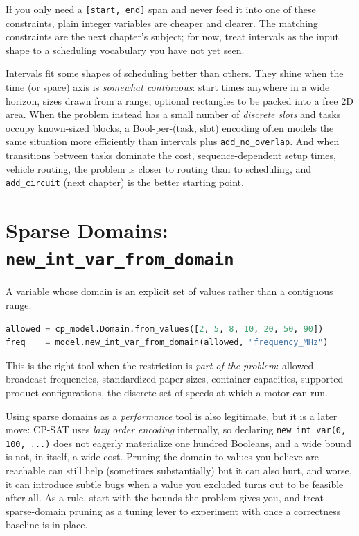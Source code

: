 If you only need a \lstinline![start, end]! span and never
feed it into one of these constraints, plain integer variables are
cheaper and clearer. The matching constraints are the next chapter's
subject; for now, treat intervals as the input shape to a scheduling
vocabulary you have not yet seen.

Intervals fit some shapes of scheduling better than others. They shine
when the time (or space) axis is \emph{somewhat continuous}: start
times anywhere in a wide horizon, sizes drawn from a range, optional
rectangles to be packed into a free 2D area. When the problem instead
has a small number of \emph{discrete slots} and tasks occupy known-sized
blocks, a Bool-per-(task, slot) encoding often models the same situation
more efficiently than intervals plus
\lstinline!add_no_overlap!. And when transitions between
tasks dominate the cost, sequence-dependent setup times, vehicle
routing, the problem is closer to routing than to scheduling, and
\lstinline!add_circuit! (next chapter) is the better
starting point.

\section{\texorpdfstring{Sparse Domains: \texttt{new\_int\_var\_from\_domain}}{Sparse Domains: new\_int\_var\_from\_domain}}\label{sec:6.5}

A variable whose domain is an explicit set of values rather than a
contiguous range.

\begin{lstlisting}[language=Python]
allowed = cp_model.Domain.from_values([2, 5, 8, 10, 20, 50, 90])
freq    = model.new_int_var_from_domain(allowed, "frequency_MHz")
\end{lstlisting}

This is the right tool when the restriction is \emph{part of the
problem}: allowed broadcast frequencies, standardized paper sizes,
container capacities, supported product configurations, the discrete set
of speeds at which a motor can run.

Using sparse domains as a \emph{performance} tool is also legitimate,
but it is a later move: CP-SAT uses \emph{lazy order encoding}
internally, so declaring
\lstinline!new_int_var(0, 100, ...)! does not eagerly
materialize one hundred Booleans, and a wide bound is not, in itself, a
wide cost. Pruning the domain to values you believe are reachable can
still help (sometimes substantially) but it can also hurt, and
worse, it can introduce subtle bugs when a value you excluded turns out
to be feasible after all. As a rule, start with the bounds the problem
gives you, and treat sparse-domain pruning as a tuning lever to
experiment with once a correctness baseline is in place.

